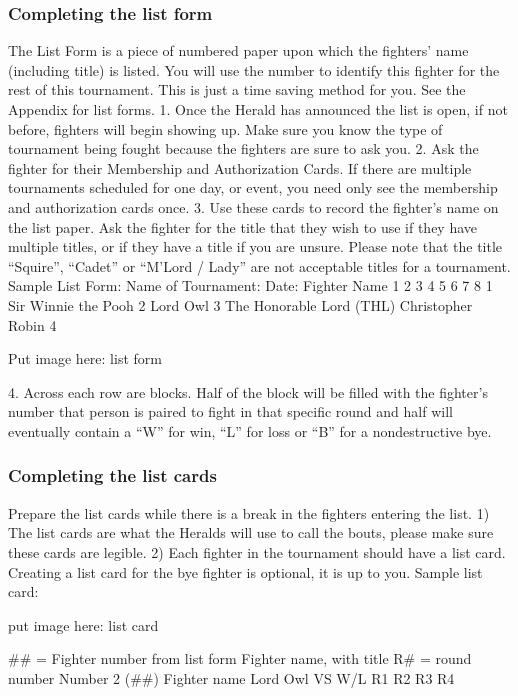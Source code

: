 \documentclass{article}
\begin{document}
\subsubsection{Completing the list form}
The List Form is a piece of numbered paper upon which the fighters’ name (including title) is listed. You
will use the number to identify this fighter for the rest of this tournament. This is just a time saving
method for you. See the Appendix for list forms.
1. Once the Herald has announced the list is open, if not before, fighters will begin showing up. Make
sure you know the type of tournament being fought because the fighters are sure to ask you.
2. Ask the fighter for their Membership and Authorization Cards. If there are multiple tournaments
scheduled for one day, or event, you need only see the membership and authorization cards once.
3. Use these cards to record the fighter’s name on the list paper. Ask the fighter for the title that they
wish to use if they have multiple titles, or if they have a title if you are unsure. Please note that the title
“Squire”, “Cadet” or “M’Lord / Lady” are not acceptable titles for a tournament.
Sample List Form:
Name of Tournament: Date:
Fighter Name 1 2 3 4 5 6 7 8
1 Sir Winnie the Pooh
2 Lord Owl
3
The Honorable Lord (THL)
Christopher Robin
4

Put image here: list form

4. Across each row are blocks. Half of the block will be filled with the fighter’s number that person is
paired to fight in that specific round and half will eventually contain a “W” for win, “L” for loss or
“B” for a nondestructive bye.

\subsubsection{Completing the list cards}

Prepare the list cards while there is a break in the fighters entering the list.
1) The list cards are what the Heralds will use to call the bouts, please make sure these cards are legible.
2) Each fighter in the tournament should have a list card. Creating a list card for the bye fighter is
optional, it is up to you.
Sample list card:

put image here: list card

\#\# = Fighter number from list form
Fighter name, with title
R\# = round number
Number 2 (\#\#)
Fighter name
Lord Owl
VS W/L
R1
R2
R3
R4
\end{document}
